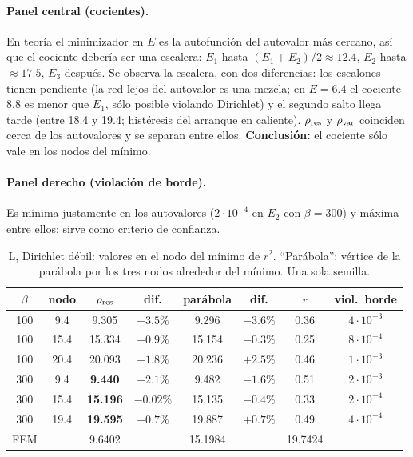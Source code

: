 \documentclass[11pt,a4paper]{article}
\begin{document}
\paragraph{Panel central (cocientes).} En teoría el minimizador en $E$ es la autofunción del autovalor más cercano, así que el
cociente debería ser una escalera: $E_1$ hasta $(E_1+E_2)/2\approx12.4$, $E_2$ hasta $\approx17.5$, $E_3$ después.
Se observa la escalera, con dos diferencias: los escalones tienen pendiente (la red lejos del autovalor es una mezcla;
en $E=6.4$ el cociente 8.8 es menor que $E_1$, sólo posible violando Dirichlet) y el segundo salto llega tarde
(entre 18.4 y 19.4; histéresis del arranque en caliente). $\rho_{\rm res}$ y $\rho_{\rm var}$ coinciden cerca de los
autovalores y se separan entre ellos. \textbf{Conclusión:} el cociente sólo vale en los nodos del mínimo.

\paragraph{Panel derecho (violación de borde).} Es mínima justamente en los autovalores ($2\cdot10^{-4}$ en $E_2$ con
$\beta=300$) y máxima entre ellos; sirve como criterio de confianza.

\begin{table}[H]\centering
\caption{L, Dirichlet débil: valores en el nodo del mínimo de $r^2$. ``Parábola'': vértice de la parábola por los tres nodos
alrededor del mínimo. Una sola semilla.}
\begin{tabular}{cccccccc}
\toprule
$\beta$ & nodo & $\rho_{\rm res}$ & dif. & parábola & dif. & $r$ & viol.\ borde\\
\midrule
100 & 9.4 & 9.305 & $-3.5\%$ & 9.296 & $-3.6\%$ & 0.36 & $4\cdot10^{-3}$\\
100 & 15.4 & 15.334 & $+0.9\%$ & 15.154 & $-0.3\%$ & 0.25 & $8\cdot10^{-4}$\\
100 & 20.4 & 20.093 & $+1.8\%$ & 20.236 & $+2.5\%$ & 0.46 & $1\cdot10^{-3}$\\
\midrule
300 & 9.4 & \textbf{9.440} & $\mathbf{-2.1\%}$ & 9.482 & $-1.6\%$ & 0.51 & $2\cdot10^{-3}$\\
300 & 15.4 & \textbf{15.196} & $\mathbf{-0.02\%}$ & 15.135 & $-0.4\%$ & 0.33 & $2\cdot10^{-4}$\\
300 & 19.4 & \textbf{19.595} & $\mathbf{-0.7\%}$ & 19.887 & $+0.7\%$ & 0.49 & $4\cdot10^{-4}$\\
\midrule
FEM & & 9.6402 & & 15.1984 & & 19.7424 &\\
\bottomrule
\end{tabular}
\end{table}
\end{document}
